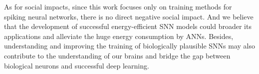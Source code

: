 \documentclass{article}
\begin{document}
As for social impacts, since this work focuses only on training methods for spiking neural networks, there is no direct negative social impact. And we believe that the development of successful energy-efficient SNN models could broader its applications and alleviate the huge energy consumption by ANNs. Besides, understanding and improving the training of biologically plausible SNNs may also contribute to the understanding of our brains and bridge the gap between biological neurons and successful deep learning.
\end{document}
